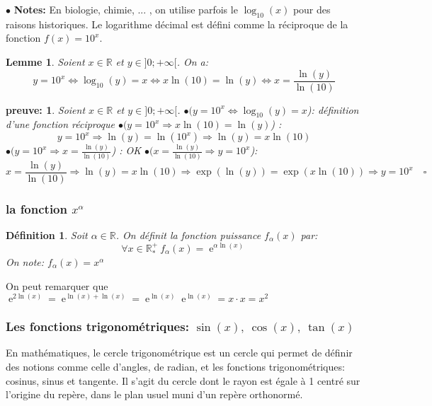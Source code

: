 \documentclass[a4paper]{article}
\theoremstyle{break}
\newtheorem{mydef}{Définition}[section]
\newtheorem*{Proof}{preuve:}
\newtheorem{lemme}{Lemme}[section]
\DeclareMathOperator{\e}{e} %
\newcommand{\R}{\mathbb{R}}
\newcommand{\note}{$\bullet$ \textbf{Notes: }}
\begin{document}
\note En biologie, chimie, ... , on utilise parfois le $\log_{10}(x)$
pour des raisons historiques. Le logarithme décimal est défini comme
la réciproque de la fonction $f(x)=10^x$.

\begin{lemme}
  Soient $x \in \R$ et $y \in ]0 ; +\infty[$.
  On a:
  \[
    y = 10^x \Leftrightarrow \log_{10}(y) = x \Leftrightarrow x\ln(10)
    = \ln(y) \Leftrightarrow x = \frac{\ln(y)}{\ln(10)}
  \]
\end{lemme}

\begin{Proof}
  Soient $x \in \R$ et $y \in ]0 ; +\infty[$.
  \newline
  $\bullet  (y = 10^x \Leftrightarrow \log_{10}(y) = x$): définition d'une
  fonction réciproque
  \newline
  $\bullet  (y = 10^x \Rightarrow x\ln(10) = \ln(y)$) :
  \[
    y = 10^x \Rightarrow \ln(y) = \ln(10^x) \Rightarrow \ln(y) = x \ln(10)   
  \]
  \newline
  $\bullet  (y = 10^x \Rightarrow x = \frac{\ln(y)}{\ln(10)}$) : OK
  \newline
  $\bullet  (x = \frac{\ln(y)}{\ln(10)} \Rightarrow y = 10^x$):
  \[
    x = \frac{\ln(y)}{\ln(10)} \Rightarrow \ln(y) = x \ln(10)
    \Rightarrow \exp(\ln(y)) =  \exp(x \ln(10) )
    \Rightarrow y = 10^x
    \quad \square
  \]
\end{Proof}

\subsubsection{la fonction $x^{\alpha}$}
\begin{mydef}
Soit $\alpha \in \R$. On définit la fonction puissance $f_{\alpha}(x)$
par:
\[
  \forall x \in \R_*^+  ~ f_{\alpha}(x) = \e^{\alpha  \ln(x)}
\]
On note: $f_{\alpha}(x)=x^{\alpha}$
\end{mydef}

On peut remarquer que $\e^{2 \ln(x)} = \e^{\ln(x)+\ln(x)} =
\e^{\ln(x)}\e^{\ln(x)} = x \cdot x = x^2$

\subsubsection{Les fonctions trigonométriques: $\sin(x), ~ \cos(x),~
  \tan(x)$}
En mathématiques, le cercle trigonométrique est un cercle qui permet
de définir des notions comme celle d'angles, de radian, et les
fonctions trigonométriques: cosinus, sinus et tangente. Il s'agit du
cercle dont le rayon est égale à 1 centré sur l'origine du repère,
dans le plan usuel muni d'un repère orthonormé.
\end{document}

